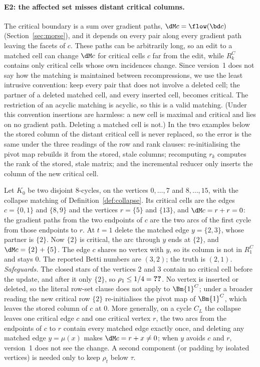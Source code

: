 \paragraph{E2: the affected set misses distant critical columns.}
The critical boundary is a sum over gradient paths, $\dM c=\flow(\bd c)$
(Section~\ref{sec:morse}), and it depends on every pair along every gradient
path leaving the facets of $c$. These paths can be arbitrarily long, so an edit
to a matched cell can change $\dM c$ for critical cells $c$ far from the edit,
while $R_k^C$ contains only critical cells whose own incidences change. Since
version~1 does not say how the matching is maintained between recompressions, we
use the least intrusive convention: keep every pair that does not involve a
deleted cell; the partner of a deleted matched cell, and every inserted cell,
becomes critical. The restriction of an acyclic matching is acyclic, so this is
a valid matching. (Under this convention insertions are harmless: a new cell is
maximal and critical and lies on no gradient path. Deleting a matched cell is
not.) In the two examples below the stored column of the distant critical cell
is never replaced, so the error is the same under the three readings of the row
and rank clauses: re-initialising the pivot map rebuilds it from the stored,
stale columns; recomputing $r_k$ computes the rank of the stored, stale matrix;
and the incremental reducer only inserts the column of the new critical cell.

\begin{example}[E2 on a graph]\label{ex:e2-cycle}
Let $K_0$ be two disjoint $8$-cycles, on the vertices $0,\dots,7$ and
$8,\dots,15$, with the collapse matching of Definition~\ref{def:collapse}. Its
critical cells are the edges $c=\{0,1\}$ and $\{8,9\}$ and the vertices
$r=\{5\}$ and $\{13\}$, and $\dM c=r+r=0$: the gradient paths from the two
endpoints of $c$ are the two arcs of the first cycle from those endpoints to
$r$. At $t=1$ delete the matched edge $y=\{2,3\}$, whose partner is $\{2\}$. Now
$\{2\}$ is critical, the arc through $y$ ends at $\{2\}$, and
$\dM c=\{2\}+\{5\}$. The edge $c$ shares no vertex with $y$, so its column is not
in $R_1^C$ and stays $0$. The reported Betti numbers are $(3,2)$; the truth is
$(2,1)$.
\emph{Safeguards.} The closed stars of the vertices $2$ and $3$ contain no
critical cell before the update, and after it only $\{2\}$, so
$\rho_1\le1/4=\textbf{??}$. No vertex is inserted or deleted, so the literal
row-set clause does not apply to $\Bm{1}^C$; under a broader reading the new
critical row $\{2\}$ re-initialises the pivot map of $\Bm{1}^C$, which leaves the
stored column of $c$ at $0$.
More generally, on a cycle $C_L$ the collapse leaves one critical edge $c$ and
one critical vertex $r$, the two arcs from the endpoints of $c$ to $r$ contain
every matched edge exactly once, and deleting any matched edge $y=\mu(x)$ makes
$\dM c=r+x\ne0$; when $y$ avoids $c$ and $r$, version~1 does not see the change.
A second component (or padding by isolated vertices) is needed only to keep
$\rho_t$ below $\tau$.
\end{example}

